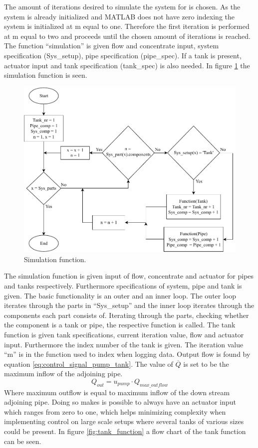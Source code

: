 The amount of iterations desired to simulate the system for is chosen. As the system is already initialized and MATLAB does not have zero indexing the system is initialized at m equal to one. Therefore the first iteration is performed at m equal to two and proceeds until the chosen amount of iterations is reached. The function ``simulation'' is given flow and concentrate input, system specification (Sys\_setup), pipe specification (pipe\_spec). If a tank is present, actuator input and tank specification (tank\_spec) is also needed.
In figure \ref{fig:simu_chart} the simulation function is seen.
\begin{figure}[H]
\centering
\includegraphics[width=0.9 \textwidth]{report/simulation/pictures/simu_chart.pdf}
\caption{Simulation function.}
\label{fig:simu_chart}
\end{figure}

The simulation function is given input of flow, concentrate and actuator for pipes and tanks respectively. Furthermore specifications of system, pipe and tank is given. The basic functionality is an outer and an inner loop. The outer loop iterates through the parts in ``Sys\_setup'' and the inner loop iterates through the components each part consists of. Iterating through the parts, checking whether the component is a tank or pipe, the respective function is called. The tank function is given tank specifications, current iteration value, flow and actuator input. Furthermore the index number of the tank is given. The iteration value ``m'' is in the function used to index when logging data. Output flow is found by equation \ref{eq:control_signal_pump_tank}. The value of $\overline Q$ is set to be the maximum inflow of the adjoining pipe. 
\begin{equation}\label{eq:imp_tank_outflow}
	Q_{out} = u_{pump} \cdot Q_{max\_outflow}
\end{equation} 
Where maximum outflow is equal to maximum inflow of the down stream adjoining pipe.
Doing so makes is possible to always have an actuator input which ranges from zero to one, which helps minimizing complexity when implementing control on large scale setups where several tanks of various sizes could be present. In figure \ref{fig:tank_function} a flow chart of the tank function can be seen.

